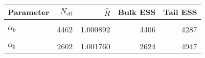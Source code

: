 \begin{table}[!h]
\centering
\begin{tabular}{>{\raggedright\arraybackslash}p{2cm}rrrr}
\toprule
Parameter & $N_{\text{eff}}$ & $\widehat{R}$ & Bulk ESS & Tail ESS\\
\midrule
\cellcolor{gray!6}{$\rho$} & \cellcolor{gray!6}{42971} & \cellcolor{gray!6}{1.000020} & \cellcolor{gray!6}{43021} & \cellcolor{gray!6}{44268}\\
$\alpha_{0}$ & 4462 & 1.000892 & 4406 & 4287\\
\cellcolor{gray!6}{$\alpha_{2}$} & \cellcolor{gray!6}{4164} & \cellcolor{gray!6}{1.001352} & \cellcolor{gray!6}{4198} & \cellcolor{gray!6}{4275}\\
$\alpha_{5}$ & 2602 & 1.001760 & 2624 & 4947\\
\bottomrule
\end{tabular}
\end{table}